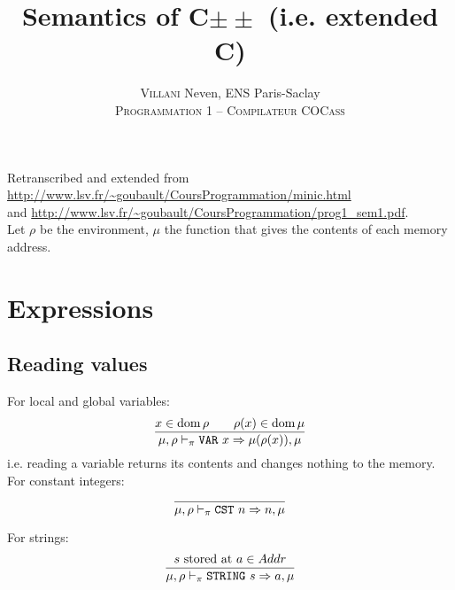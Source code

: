 

\newcommand{\envyields}{\mu,\rho\vdash_\pi}
\newcommand{\modsize}{\mod 2^{64}}

\title{Semantics of C\(\pm\pm\) (i.e. extended C\textminus\textminus)}
\author{\textsc{Villani} Neven, ENS Paris-Saclay\\\textsc{Programmation 1 -- Compilateur COCass}}


\maketitle

Retranscribed and extended from \url{http://www.lsv.fr/~goubault/CoursProgrammation/minic.html}\\
and \url{http://www.lsv.fr/~goubault/CoursProgrammation/prog1_sem1.pdf}.\\

Let \(\rho\) be the environment, \(\mu\) the function that gives the contents of each memory address.\\

\section{Expressions}
\subsection{Reading values}

For local and global variables:
\[\dfrac{x\in\dom\rho \qquad \rho(x)\in\dom\mu}{\envyields \struct{VAR}\ x\tto \mu(\rho(x)), \mu}\]
i.e. reading a variable returns its contents and changes nothing to the memory.\\

For constant integers:
\[\dfrac{}{\envyields \struct{CST}\ n\tto n, \mu}\]

For strings:
\[\dfrac{s\text{ stored at }a\in Addr}{\envyields \struct{STRING}\ s\tto a, \mu}\]


